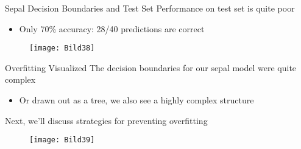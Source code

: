 \documentclass[aspectratio=169]{../latex_main/tntbeamer}  %
\begin{document}
	
	
	\begin{frame}{Sepal Decision Boundaries and Test Set}
	    Performance on test set is quite poor
	    \begin{itemize}
	        \item Only 70\% accuracy: 28/40 predictions are correct
	    \end{itemize}
	    \begin{figure}
	        \centering
	        \texttt{[image: Bild38]}
	    \end{figure}
	\end{frame}
	
	
	\begin{frame}{Overfitting Visualized}
	    The decision boundaries for our sepal model were quite complex
	    \begin{itemize}
	        \item Or drawn out as a tree, we also see a highly complex structure
	    \end{itemize}
	    Next, we’ll discuss strategies for preventing overfitting
	    \begin{figure}
	        \centering
	        \texttt{[image: Bild39]}
	    \end{figure}
	\end{frame}
\end{document}
